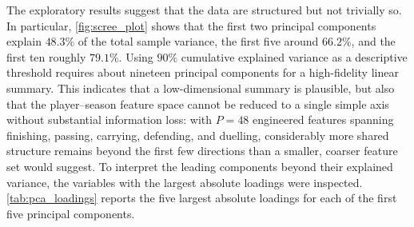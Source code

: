 The exploratory results suggest that the data are structured but not trivially so. In particular, \autoref{fig:scree_plot} shows that the first two principal components explain \(48.3\%\) of the total sample variance, the first five around \(66.2\%\), and the first ten roughly \(79.1\%\). Using \(90\%\) cumulative explained variance as a descriptive threshold requires about nineteen principal components for a high-fidelity linear summary. This indicates that a low-dimensional summary is plausible, but also that the player--season feature space cannot be reduced to a single simple axis without substantial information loss: with \(P=48\) engineered features spanning finishing, passing, carrying, defending, and duelling, considerably more shared structure remains beyond the first few directions than a smaller, coarser feature set would suggest. To interpret the leading components beyond their explained variance, the variables with the largest absolute loadings were inspected. \autoref{tab:pca_loadings} reports the five largest absolute loadings for each of the first five principal components.


